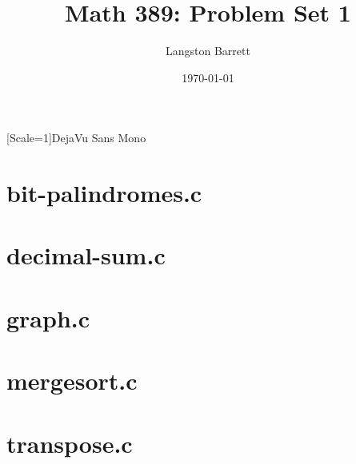 \documentclass{article}
\begin{document}
\title{Math 389: Problem Set 1}
\author{Langston Barrett}
\date{\today}
\maketitle
\newfontfamily{\lstsansserif}[Scale=1]{DejaVu Sans Mono} %
\lstset{showstringspaces=\false}

\section{bit-palindromes.c}


\section{decimal-sum.c}


\section{graph.c}


\section{mergesort.c}


\section{transpose.c}

\end{document}
